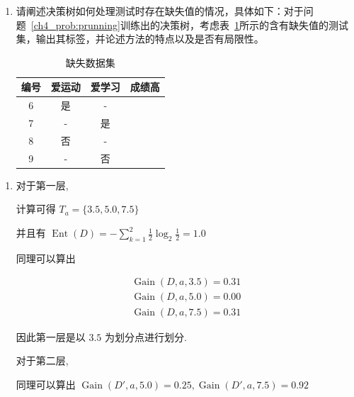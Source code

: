 \documentclass[answers]{exam}  %
\begin{document}
\begin{questions}
\begin{enumerate}
    \item 请阐述决策树如何处理测试时存在缺失值的情况，具体如下：对于问题~\ref{ch4_prob:prunning}训练出的决策树，考虑表~\ref{ch4_tab:artificial_testing_dataset2}所示的含有缺失值的测试集，输出其标签，并论述方法的特点以及是否有局限性。
          \begin{table}[ht]
            \centering
            \caption{缺失数据集}\label{ch4_tab:artificial_testing_dataset2}
            \begin{tabular}{cccc}
              \hline 编号 & 爱运动 & 爱学习 & 成绩高 \\
              \hline 6    & 是     & -      &        \\
              7           & -      & 是     &        \\
              8           & 否     & -      &        \\
              9           & -      & 否     &        \\
              \hline
            \end{tabular}
          \end{table}

  \end{enumerate}
  \begin{solution}
    \begin{enumerate}

      \item

            对于第一层,

            计算可得 $T_a = \{ 3.5, 5.0, 7.5 \}$

            并且有 $\displaystyle \operatorname{Ent}(D) = -\sum_{k=1}^{2}\frac{1}{2}\log_2 \frac{1}{2} = 1.0$

            同理可以算出
            
            $$
            \begin{aligned}
              \operatorname{Gain}(D, a, 3.5) = 0.31 \\ \operatorname{Gain}(D, a, 5.0) = 0.00 \\ \operatorname{Gain}(D, a, 7.5) = 0.31
            \end{aligned}
            $$

            因此第一层是以 $3.5$ 为划分点进行划分.

            对于第二层,

            同理可以算出 $\displaystyle \operatorname{Gain}(D', a, 5.0) = 0.25, \operatorname{Gain}(D', a, 7.5) = 0.92$


\end{enumerate}
\end{solution}
\end{questions}
\end{document}
